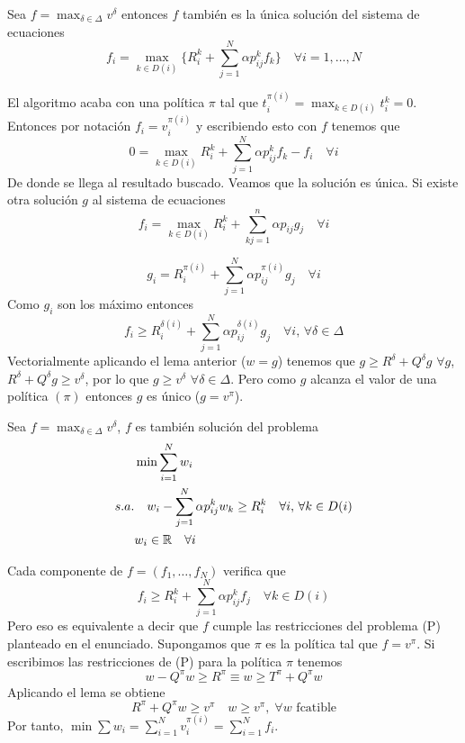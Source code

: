 \documentclass[MIOP.tex]{subfiles}
\begin{document}
\begin{lemma}
Sea $f=\max_{\delta \in \Delta}v^\delta$ entonces $f$ también es la única solución del sistema de ecuaciones 
$$
f_i = \max_{k\in D(i)}\{R_i^k + \sum_{j=1}^N \alpha p_{ij}^k f_k\} \quad \forall i = 1, \dotsc, N
$$
\end{lemma}
\begin{dem}
El algoritmo acaba con una política $\pi$ tal que $t_i^{\pi(i)} = \max_{k\in D(i)} t_i^k = 0$. Entonces por notación $f_i = v_i^{\pi(i)}$ y escribiendo esto con $f$ tenemos que 
$$
0 = \max_{k\in D(i)} R_i^k + \sum_{j=1}^N \alpha p_{ij}^k f_k - f_i \quad  \forall i$$
De donde se llega al resultado buscado. Veamos que la solución es única. Si existe otra solución $g$ al sistema de ecuaciones
$$
f_i = \max_{k\in D(i)} R^k_i + \sum_{kj=1}^n \alpha p_{ij}g_j \quad \forall i$$

$$g_i = R_i^{\pi(i)}+\sum_{j=1}^N \alpha p_{ij}^{\pi(i)}g_j \quad \forall i$$
Como $g_i$ son los máximo entonces 
$$f_i \geq R_i^{\delta(i)}+\sum_{j=1}^N \alpha p_{ij}^{\delta(i)}g_j \quad \forall i,\,\forall \delta \in \Delta$$
Vectorialmente aplicando el lema anterior ($w=g$) tenemos que $g\geq R^\delta+Q^\delta g$ $\forall g$, $R^\delta+Q^\delta g\geq v^\delta$, por lo que $g\geq v^\delta$ $\forall \delta \in \Delta$. Pero como $g$ alcanza el valor de una política $(\pi)$ entonces $g$ es único ($g=v^\pi$).
\end{dem}
\begin{teorema}
Sea $f=\max_{\delta \in \Delta}v^\delta$, $f$ es también solución del problema
\begin{align*}
&\min \sum_{i=1}^N w_i\\
s.a. &\quad w_i - \sum_{j=1}^N \alpha p_{ij}^k w_k \geq R^k_i\quad \forall i,\, \forall k\in D(i)\\
&w_i \in \mathbb{R} \quad \forall i
\end{align*}
\end{teorema}
\begin{dem}
Cada componente de $f=(f_1,\dotsc,f_N)$ verifica que 
$$
f_i \geq R_i^k + \sum_{j=1}^N \alpha p_{ij}^k f_j \quad \forall k\in D(i)$$
Pero eso es equivalente a decir que $f$ cumple las restricciones del problema (P) planteado en el enunciado. Supongamos que $\pi$ es la política tal que $f=v^\pi$. Si escribimos las restricciones de (P) para la política $\pi$ tenemos
$$
w-Q^\pi w \geq R^\pi \equiv w \geq T^\pi + Q^\pi w
$$
Aplicando el lema se obtiene
$$
R^\pi + Q^\pi w \geq v^\pi \quad w\geq v^\pi, \; \forall w \text{ fcatible}
$$
Por tanto, $\min \sum w_i = \sum_{i=1}^N v_i^{\pi(i)} = \sum_{i=1}^N f_i$.
\end{dem}
\end{document}

